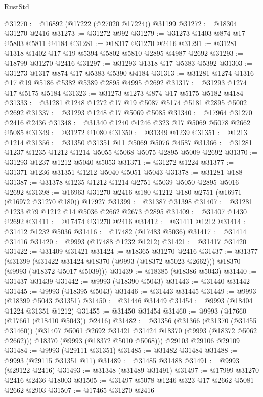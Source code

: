 \begin{lexlean}{RustStd}
\begin{coremodule}
@31270 := @16892 (@17222 (@27020 @17224)) @31199
@31272 := @18304 @31270 @2416
@31273 := @31272 @992
@31279 := @31273 @1403 @874 @17 @5803 @5811 @4184
@31281 := @18317 @31270 @2416
@31291 := @31281 @1318 @1402 @17 @19 @5394 @5802 @5810 @2895 @4987 @2692
@31293 := @18799 @31270 @2416
@31297 := @31293 @1318 @17 @5383 @5392
@31303 := @31273 @1317 @874 @17 @5383 @5390 @4184
@31313 := @31281 @1274 @1316 @17 @19 @5186 @5382 @5389 @2895 @4995 @2692
@31317 := @31293 @1274 @17 @5175 @5184
@31323 := @31273 @1273 @874 @17 @5175 @5182 @4184
@31333 := @31281 @1248 @1272 @17 @19 @5087 @5174 @5181 @2895 @5002 @2692
@31337 := @31293 @1248 @17 @5069 @5085
@31340 := @17964 @31270 @2416 @2436
@31348 := @31340 @1240 @1246 @323 @17 @5069 @5078 @2662 @5085
@31349 := @31272 @1080
@31350 := @31349 @1239
@31351 := @1213 @1214
@31356 := @31350 @31351 @11 @5069 @5076 @4587
@31366 := @31281 @1237 @1235 @1212 @1214 @5055 @5068 @5075 @2895 @5009 @2692
@31370 := @31293 @1237 @1212 @5040 @5053
@31371 := @31272 @1224
@31377 := @31371 @1236 @31351 @1212 @5040 @5051 @5043
@31378 := @31281 @188
@31387 := @31378 @1235 @1212 @1214 @2751 @5039 @5050 @2895 @5016 @2692
@31398 := @16963 @31270 @2416 @180 @1212 @180 @2751 (@16971 (@16972 @31270 @180)) @17927
@31399 := @31387 @31398
@31407 := @31281 @1233 @79 @1212 @14 @5036 @2662 @2673 @2895
@31409 := @31407 @1430 @2692
@31411 := @17474 @31270 @2416
@31412 := @31411 @1212
@31414 := @31412 @1232 @5036
@31416 := @17482 (@17483 @5036)
@31417 := @31414 @31416
@31420 := @9993 (@17488 @1232 @1212)
@31421 := @31417 @31420
@31422 := @31409 @31421
@31424 := @18365 @31270 @2416
@31437 := @31377
    (@31399 (@31422 @31424 @18370 (@9993 (@18372 @5023 @2662))) @18370 (@9993 (@18372 @5017 @5039)))
@31439 := @18385 (@18386 @5043)
@31440 := @31437 @31439
@31442 := @9993 (@18390 @5043)
@31443 := @31440 @31442
@31445 := @9993 (@18395 @5043)
@31446 := @31443 @31445
@31449 := @9993 (@18399 @5043 @31351)
@31450 := @31446 @31449
@31454 := @9993 (@18404 @1224 @31351 @1212)
@31455 := @31450 @31454
@31460 := @9993 (@17660 (@17661 (@18410 @5043)) @2416)
@31482 := @31356
    (@31366
      (@31370 (@31455 @31460))
      (@31407 @5061 @2692 @31421 @31424 @18370 (@9993 (@18372 @5062 @2662)))
      @18370
      (@9993 (@18372 @5010 @5068)))
    @29103
    @29106
    @29109
@31484 := @9993 (@29111 @31351)
@31485 := @31482 @31484
@31488 := @9993 (@29115 @31351 @11)
@31489 := @31485 @31488
@31491 := @9993 (@29122 @2416)
@31493 := @31348 (@31489 @31491)
@31497 := @17999 @31270 @2416 @2436 @18003
@31505 := @31497 @5078 @1246 @323 @17 @2662 @5081 @2662 @2903
@31507 := @17465 @31270 @2416

\end{coremodule}
\end{lexlean}
